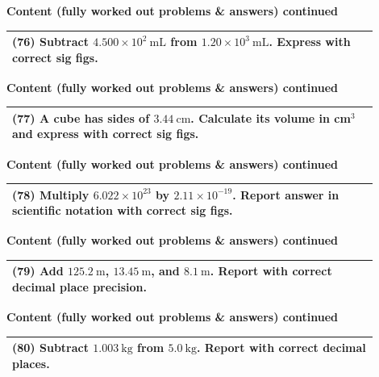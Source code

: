 \documentclass{article}
\begin{document}
\noindent
{\large \textbf{Content (fully worked out problems \& answers) continued}} \\[0.2em]
\begin{tabular}{|p{0.9\linewidth}|}
\hline
\vspace{0.2cm}
\textbf{(76)} Subtract $4.500 \times 10^2~\text{mL}$ from $1.20 \times 10^3~\text{mL}$. Express with correct sig figs. \\
\hline
\end{tabular}
\newpage

\noindent
{\large \textbf{Content (fully worked out problems \& answers) continued}} \\[0.2em]
\begin{tabular}{|p{0.9\linewidth}|}
\hline
\vspace{0.2cm}
\textbf{(77)} A cube has sides of $3.44~\text{cm}$. Calculate its volume in cm$^3$ and express with correct sig figs. \\
\hline
\end{tabular}
\newpage

\noindent
{\large \textbf{Content (fully worked out problems \& answers) continued}} \\[0.2em]
\begin{tabular}{|p{0.9\linewidth}|}
\hline
\vspace{0.2cm}
\textbf{(78)} Multiply $6.022 \times 10^{23}$ by $2.11 \times 10^{-19}$. Report answer in scientific notation with correct sig figs. \\
\hline
\end{tabular}
\newpage

\noindent
{\large \textbf{Content (fully worked out problems \& answers) continued}} \\[0.2em]
\begin{tabular}{|p{0.9\linewidth}|}
\hline
\vspace{0.2cm}
\textbf{(79)} Add $125.2~\text{m}$, $13.45~\text{m}$, and $8.1~\text{m}$. Report with correct decimal place precision. \\
\hline
\end{tabular}
\newpage

\noindent
{\large \textbf{Content (fully worked out problems \& answers) continued}} \\[0.2em]
\begin{tabular}{|p{0.9\linewidth}|}
\hline
\vspace{0.2cm}
\textbf{(80)} Subtract $1.003~\text{kg}$ from $5.0~\text{kg}$. Report with correct decimal places. \\
\hline
\end{tabular}
\newpage
\end{document}
